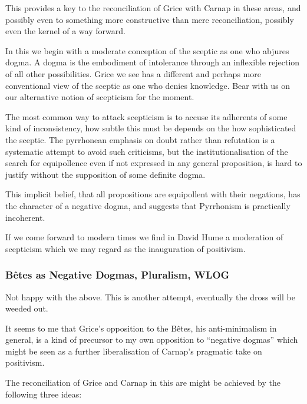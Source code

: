 \documentclass[10pt,titlepage]{book}
\begin{document}
This provides a key to the reconciliation of Grice with Carnap in these areas, and possibly even to something more constructive than mere reconciliation, possibly even the kernel of a way forward.

In this we begin with a moderate conception of the sceptic as one who abjures dogma.
A dogma is the embodiment of intolerance through an inflexible rejection of all other possibilities.
Grice we see has a different and perhaps more conventional view of the sceptic as one who denies knowledge.
Bear with us on our alternative notion of scepticism for the moment.

The most common way to attack scepticism is to accuse its adherents of some kind of inconsistency, how subtle this must be depends on the how sophisticated the sceptic.
The pyrrhonean emphasis on doubt rather than refutation is a systematic attempt to avoid such criticisms, but the institutionalisation of the search for equipollence even if not expressed in any general proposition, is hard to justify without the supposition of some definite dogma.

This implicit belief, that all propositions are equipollent with their negations, has the character of a negative dogma, and suggests that Pyrrhonism is practically incoherent.

If we come forward to modern times we find in David Hume a moderation of scepticism which we may regard as the inauguration of positivism.

\subsubsection{B\^etes as Negative Dogmas, Pluralism, WLOG}

Not happy with the above.
This is another attempt, eventually the dross will be weeded out.

It seems to me that Grice's opposition to the B\^etes, his anti-minimalism in general, is a kind of precursor to my own opposition to ``negative dogmas'' which might be seen as a further liberalisation of Carnap's pragmatic take on positivism.

The reconciliation of Grice and Carnap in this are might be achieved by the following three ideas:
\end{document}
